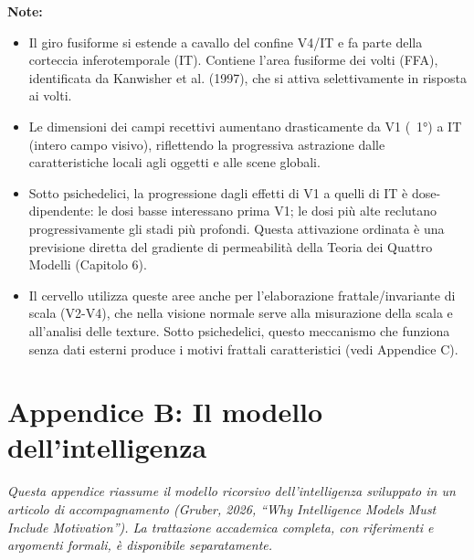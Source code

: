 \documentclass[11pt, twoside, openright]{book}
\begin{document}
\textbf{Note:}
\begin{itemize}
  \item Il giro fusiforme si estende a cavallo del confine V4/\allowbreak{}IT e fa parte della corteccia inferotemporale (IT). Contiene l'area fusiforme dei volti (FFA), identificata da Kanwisher et al. (1997), che si attiva selettivamente in risposta ai volti.
  \item Le dimensioni dei campi recettivi aumentano drasticamente da V1 (~1°) a IT (intero campo visivo), riflettendo la progressiva astrazione dalle caratteristiche locali agli oggetti e alle scene globali.
  \item Sotto psichedelici, la progressione dagli effetti di V1 a quelli di IT è dose-dipendente: le dosi basse interessano prima V1; le dosi più alte reclutano progressivamente gli stadi più profondi. Questa attivazione ordinata è una previsione diretta del gradiente di permeabilità della Teoria dei Quattro Modelli (Capitolo 6).
  \item Il cervello utilizza queste aree anche per l'elaborazione frattale/\allowbreak{}invariante di scala (V2-V4), che nella visione normale serve alla misurazione della scala e all'analisi delle texture. Sotto psichedelici, questo meccanismo che funziona senza dati esterni produce i motivi frattali caratteristici (vedi Appendice C).
\end{itemize}


\chapter*{Appendice B: Il modello dell'intelligenza}

\textit{Questa appendice riassume il modello ricorsivo dell'intelligenza sviluppato in un articolo di accompagnamento (Gruber, 2026, ``Why Intelligence Models Must Include Motivation''). La trattazione accademica completa, con riferimenti e argomenti formali, è disponibile separatamente.}
\end{document}
